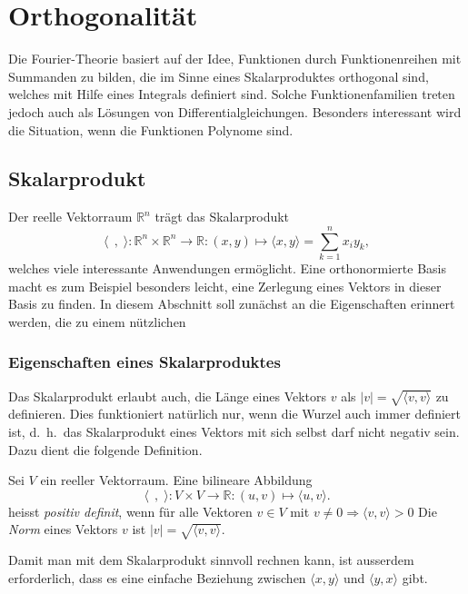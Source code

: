 %
%
%
\section{Orthogonalität
\label{buch:integral:section:orthogonale-polynome}}
Die Fourier-Theorie basiert auf der Idee, Funktionen durch 
Funktionenreihen mit Summanden zu bilden, die im Sinne eines
Skalarproduktes orthogonal sind, welches mit Hilfe eines Integrals
definiert sind.
Solche Funktionenfamilien treten jedoch auch als Lösungen von
Differentialgleichungen.
Besonders interessant wird die Situation, wenn die Funktionen 
Polynome sind.

%
%
\subsection{Skalarprodukt}
Der reelle Vektorraum $\mathbb{R}^n$ trägt das Skalarprodukt
\[
\langle\;\,,\;\rangle
\colon
\mathbb{R}^n \times \mathbb{R}^n \to \mathbb{R}
:
(x,y)\mapsto \langle x, y\rangle = \sum_{k=1}^n x_iy_k,
\]
welches viele interessante Anwendungen ermöglicht.
Eine orthonormierte Basis macht es zum Beispiel besonders leicht,
eine Zerlegung eines Vektors in dieser Basis zu finden.
In diesem Abschnitt soll zunächst an die Eigenschaften erinnert
werden, die zu einem nützlichen 

\subsubsection{Eigenschaften eines Skalarproduktes}
Das Skalarprodukt erlaubt auch, die Länge eines Vektors $v$
als $|v| = \sqrt{\langle v,v\rangle}$ zu definieren.
Dies funktioniert natürlich nur, wenn die Wurzel auch immer
definiert ist, d.~h.~das Skalarprodukt eines Vektors mit sich
selbst darf nicht negativ sein.
Dazu dient die folgende Definition.

\begin{definition}
Sei $V$ ein reeller Vektorraum.
Eine bilineare Abbildung
\[
\langle\;\,,\;\rangle
\colon
V\times V
\to
\mathbb{R}
:
(u,v) \mapsto \langle u,v\rangle.
\]
heisst {\em positiv definit}, wenn für alle Vektoren $v \in V$ mit
$v\ne 0 \Rightarrow \langle v,v\rangle > 0$ 
Die {\em Norm} eines Vektors $v$ ist
$|v|=\sqrt{\langle v,v\rangle}$.
\end{definition}

Damit man mit dem Skalarprodukt sinnvoll rechnen kann, ist ausserdem
erforderlich, dass es eine einfache Beziehung zwischen 
$\langle x,y\rangle$ und $\langle y,x\rangle$ gibt.


